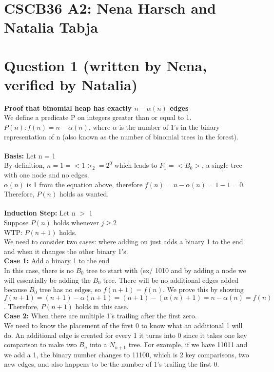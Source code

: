 \documentclass[11pt, a4paper]{article}
\begin{document}
\section*{CSCB36 A2: Nena Harsch and Natalia Tabja}
\section*{Question 1 (written by Nena, verified by Natalia)}
\textbf{Proof that binomial heap has exactly $n - \alpha(n)$ edges}\\
We define a predicate P on integers greater than or equal to 1. \\
$P(n) : f(n) = n - \alpha(n)$, where $\alpha$ is the number of 1's in the binary representation of n (also known as the number of binomial trees in the forest). \\\\
\textbf{Basis:} Let n = 1 \\
By definition, $n = 1 = <1>_2 = 2^0$ which leads to $F_1 = <B_0>$, a single tree with one node and no edges. \\
$\alpha(n)$ is 1 from the equation above, therefore $f(n) = n - \alpha(n) = 1 - 1 = 0$. \\
Therefore, $P(n)$ holds as wanted. \\\\
\textbf{Induction Step:} Let n $>$ 1 \\
Suppose $P(n)$ holds whenever $j \geq 2$ \\
WTP: $P(n + 1)$ holds. \\
We need to consider two cases: where adding on just adds a binary 1 to the end and when it changes the other binary 1's. \\
\textbf{Case 1:} Add a binary 1 to the end\\
In this case, there is no $B_0$ tree to start with (ex/ 1010 and by adding a node we will essentially be adding the $B_0$ tree. There will be no additional edges added because $B_0$ tree has no edges, so $f(n+1) = f(n)$. We prove this by showing $f(n + 1) = (n + 1) - \alpha(n + 1) = (n + 1) - (\alpha(n) + 1) = n - \alpha(n) = f(n)$. Therefore, $P(n+1)$ holds in this case.\\
\textbf{Case 2:} When there are multiple 1's trailing after the first zero. \\
We need to know the placement of the first 0 to know what an additional 1 will do. An additional edge is created for every 1 it turns into 0 since it takes one key comparison to make two $B_n$ into a $N_{n+1}$ tree. For example, if we have 11011 and we add a 1, the binary number changes to 11100, which is 2 key comparisons, two new edges, and also happens to be the number of 1's trailing the first 0. \\
\end{document}
